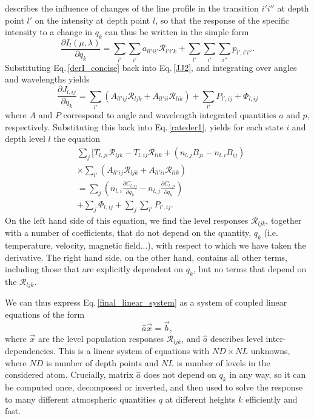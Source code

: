 \documentclass{aa}
\begin{document}
describes the influence of changes of the line profile in the transition $i'i''$ at depth point $l'$ on the intensity at depth point $l$, so that the response of the specific intensity to a change in $q_k$ can thus be written in the simple form
\begin{equation} 
 \frac{\partial I_l(\mu,\lambda)}{\partial q_k} = \sum_{l'} \sum_{i'} a_{ll'ii'} {\mathcal R}_{l'i'k} + \sum_{l'}\sum_{i'}\sum_{i''} p_{l',i'i''}.
 \label{derI_concise}
\end{equation}
Substituting Eq.\,\ref{derI_concise} back into Eq.\,\ref{JJ2}, and integrating over angles and wavelengths yields
\begin{equation}
 \frac{\partial J_{l,ij}}{\partial q_k} = \sum_{l'} (A_{ll'ij} {\mathcal R}_{ljk}+ A_{ll'ii} {\mathcal R}_{lik}) + \sum_{l'} P_{l',ij} + \Phi_{l,ij}
\end{equation}
where $A$ and $P$ correspond to angle and wavelength integrated quantities $a$ and $p$, respectively. Substituting this back into Eq.\,\ref{rateder1}, yields for each state $i$ and depth level $l$ the equation
\begin{align}
&\sum_j  [ T_{l,ji}\mathcal{R}_{ljk} - T_{l,ij}\mathcal{R}_{lik} + 
(n_{l,j}B_{ji} - n_{l,i}B_{ij})  \nonumber \\
& \times \sum_{l'} (A_{ll'ij} {\mathcal R}_{ljk}+ A_{ll'ii} {\mathcal R}_{lik}) \nonumber \\
& = \sum_j (n_{l,i} \frac{\partial C_{l,ij}}{\partial q_k} - n_{l,j} \frac{\partial C_{l,ji}}{\partial q_k}) \nonumber \\
& + \sum_j \Phi_{l,ij} + \sum_j \sum_{l'} P_{l',ij}.
 \label{final_linear_system}
\end{align}
On the left hand side of this equation, we find the level responses ${\mathcal R}_{ljk}$, together with a number of coefficients, that do not depend on the quantity, $q_k$ (i.e. temperature, velocity, magnetic field...), with respect to which we have taken the derivative. The right hand side, on the other hand, contains all other terms, including those that are explicitly dependent on $q_k$, but no terms that depend on the ${\mathcal R}_{ljk}$. 

We can thus express Eq.\,\ref{final_linear_system} as a system of coupled linear equations of the form
\begin{equation}
 \hat{a} \vec{x} = \vec{b},
\end{equation}
where $\vec{x}$ are the level population responses ${\mathcal R}_{ljk}$, and $\hat{a}$ describes level inter-dependencies. This is a linear system of equations with $ND \times NL$ unknowns, where $ND$ is number of depth points and $NL$ is number of levels in the considered atom. Crucially, matrix $\hat{a}$ does not depend on $q_k$ in any way, so it can be computed once, decomposed or inverted, and then used to solve the response to many different atmospheric quantities $q$ at different heights $k$ efficiently and fast. 
\end{document}
